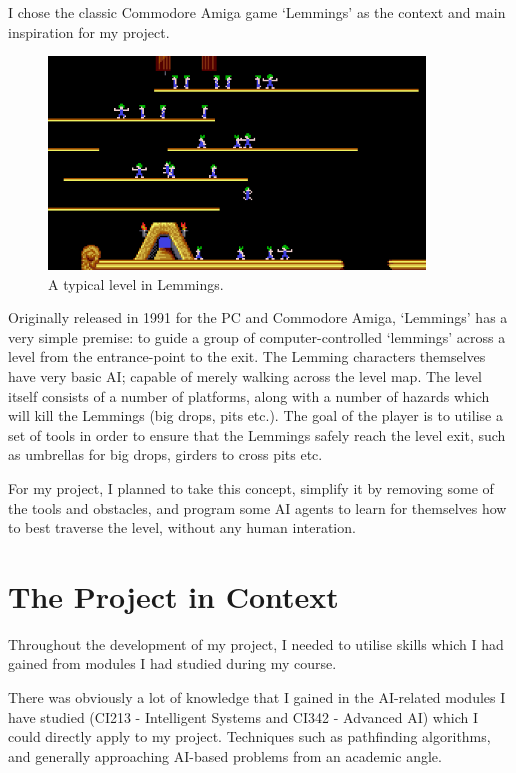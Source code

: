 \documentclass[a4paper,oneside]{report}
\begin{document}
I chose the classic Commodore Amiga game `Lemmings' as the context and main inspiration for my project.

\begin{figure}[h!]
  \centering
    \includegraphics[width=100mm]{sources/images/lemmings3}
    \caption{A typical level in Lemmings.\label{screen}}
\end{figure}

Originally released in 1991 for the PC and Commodore Amiga, `Lemmings' has a very simple premise: to guide a group of computer-controlled `lemmings’ across a level from the entrance-point to the exit. The Lemming characters themselves have very basic AI; capable of merely walking across the level map. The level itself consists of a number of platforms, along with a number of hazards which will kill the Lemmings (big drops, pits etc.). The goal of the player is to utilise a set of tools in order to ensure that the Lemmings safely reach the level exit, such as umbrellas for big drops, girders to cross pits etc. 

For my project, I planned to take this concept, simplify it by removing some of the tools and obstacles, and program some AI agents to learn for themselves how to best traverse the level, without any human interation.
		
\section{The Project in Context}
	
Throughout the development of my project, I needed to utilise skills which I had gained from modules I had studied during my course.

There was obviously a lot of knowledge that I gained in the AI-related modules I have studied (CI213 - Intelligent Systems and CI342 - Advanced AI) which I could directly apply to my project. Techniques such as pathfinding algorithms, and generally approaching AI-based problems from an academic angle.
\end{document}
